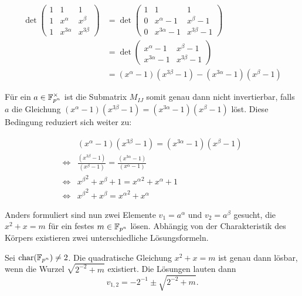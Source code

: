 \begin{align*}
    \det \begin{pmatrix}
        1 & 1 & 1 \\
        1 & x^{\alpha} & x^{\beta} \\
        1 & x^{3\alpha} & x^{3\beta}
    \end{pmatrix}
    &= \det \begin{pmatrix}
        1 & 1 & 1 \\
        0 & x^{\alpha} -1 & x^{\beta} -1 \\
        0 & x^{3\alpha} -1 & x^{3\beta} -1
    \end{pmatrix} \\
    &= \det \begin{pmatrix}
        x^{\alpha} -1 & x^{\beta} -1 \\
        x^{3\alpha} -1 & x^{3\beta} -1
    \end{pmatrix} \\
    &= (x^{\alpha} -1)(x^{3\beta} -1) - (x^{3\alpha} -1)(x^{\beta} -1)
\end{align*}

Für ein $a \in \field{p}[n]^\times$ ist die Submatrix $M_{IJ}$ somit genau dann nicht invertierbar, falls $a$ die Gleichung $(x^{\alpha} -1)(x^{3\beta} -1) = (x^{3\alpha} -1)(x^{\beta} -1)$ löst. Diese Bedingung reduziert sich weiter zu:

\begin{align}
        & (x^{\alpha} -1)(x^{3\beta} -1) = (x^{3\alpha} -1)(x^{\beta} -1) \nonumber \\
    \iff & \frac{(x^{3\beta} -1)}{(x^{\beta} -1)} = \frac{(x^{3\alpha} -1)}{(x^{\alpha} -1)} \nonumber \\
    \iff & {x^\beta}^2 + x^{\beta} + 1 = {x^{\alpha}}^2 + x^{\alpha} + 1 \nonumber \\
    \iff & {x^\beta}^2 + x^{\beta} = {x^{\alpha}}^2 + x^{\alpha} \label{equation:013}
\end{align}

Anders formuliert sind nun zwei Elemente $v_1 = a^\alpha$ und $v_2 = a^\beta$ gesucht, die $x^2 + x = m$ für ein festes $m \in \field{p}[n]$ lösen. Abhängig von der Charakteristik des Körpers existieren zwei unterschiedliche Lösungsformeln.

\begin{lemma}
    Sei $\charac(\field{p}[n]) \neq 2$. Die quadratische Gleichung $x^2 + x = m$ ist genau dann lösbar, wenn die Wurzel $\sqrt{2^{-2} + m}$ existiert. Die Lösungen lauten dann
    \begin{equation*}
        v_{1,2} = -2^{-1} \pm \sqrt{2^{-2} + m}.
    \end{equation*}
\end{lemma}

